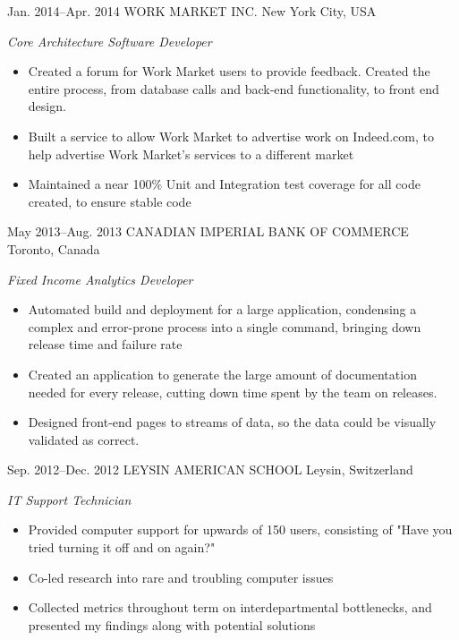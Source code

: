\documentclass[]{friggeri-cv} %
\begin{document}
\begin{entrylist}
\entry
{Jan. 2014--Apr. 2014}
{WORK MARKET INC.}
{New York City, USA}
{\emph{Core Architecture Software Developer } \\
\begin{itemize}
	\item Created a forum for Work Market users to provide feedback. Created the entire process, from database calls and back-end functionality, to front end design.
	\item Built a service to allow Work Market to advertise work on Indeed.com, to help advertise Work Market's services to a different market
	\item Maintained a near 100\% Unit and Integration test coverage for all code created, to ensure stable code  
\end{itemize}
}
\end{entrylist}

\begin{entrylist}
\entry
{May 2013--Aug. 2013}
{CANADIAN IMPERIAL BANK OF COMMERCE}
{Toronto, Canada}
{\emph{Fixed Income Analytics Developer} \\
\begin{itemize}
	\item Automated build and deployment for a large application, condensing a complex and error-prone process into a single command, bringing down release time and failure rate
	\item Created an application to generate the large amount of documentation needed for every release, cutting down time spent by the team on releases.
	\item Designed front-end pages to streams of data, so the data could be visually validated as correct.
\end{itemize}
}
\end{entrylist}

\begin{entrylist}
\entry
{Sep. 2012--Dec. 2012}
{LEYSIN AMERICAN SCHOOL}
{Leysin, Switzerland}
{\emph{IT Support Technician} \\
\begin{itemize}
	\item Provided computer support for upwards of 150 users, consisting of "Have you tried turning it off and on again?" 
	\item Co-led research into rare and troubling computer issues
	\item Collected metrics throughout term on interdepartmental bottlenecks, and presented my findings along with potential solutions 
\end{itemize}
}
\end{entrylist}
\end{document}
